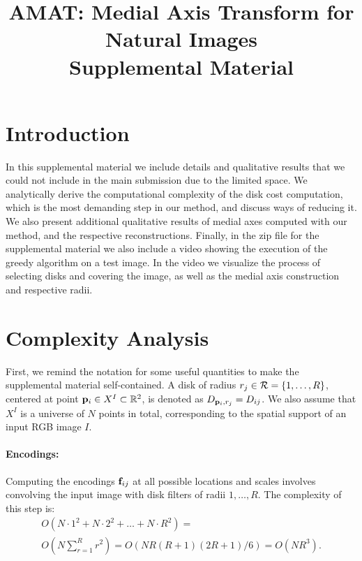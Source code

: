 \documentclass[10pt,twocolumn,letterpaper]{article}
\begin{document}
\title{AMAT: Medial Axis Transform for Natural Images \\ Supplemental Material}
\maketitle

\section{Introduction}\label{sec:introduction}
In this supplemental material we include details and qualitative results that we could not include in the main submission due to the limited space.
We analytically derive the computational complexity of the disk cost computation, which is the most demanding step in our method, 
and discuss ways of reducing it.
We also present additional qualitative results of medial axes computed with our method, and the respective reconstructions.
Finally, in the zip file for the supplemental material we also include a video showing the execution of the greedy algorithm on a test image.
In the video we visualize the process of selecting disks and covering the image, as well as the medial axis construction and respective radii.

\section{Complexity Analysis}\label{sec:complexity}
First, we remind the notation for some useful quantities to make the supplemental material self-contained.
A disk of radius $r_j\in \mathcal{R} = \{1,\ldots,R\}$, 
centered at point $\mathbf{p}_{i}\in X^I \subset \mathbb{R}^2$, is denoted as $D_{\mathbf{p}_{i},r_j} = D_{ij}$.
We also assume that $X^I$ is a universe of $N$ points in total, corresponding to the spatial support of an input RGB image $I$.

\paragraph{Encodings:} Computing the encodings $\mathbf{f}_{ij}$ at all possible locations and scales involves convolving the input image 
with disk filters of radii $1,\ldots,R$. 
The complexity of this step is:
\begin{align}
\nonumber
O(N\cdot 1^2 + N\cdot 2^2 + \ldots + N \cdot R^2) = \\
O(N\sum_{r=1}^R r^2) = O(NR(R+1)(2R+1)/6) = O(NR^3).
\end{align}
\end{document}
